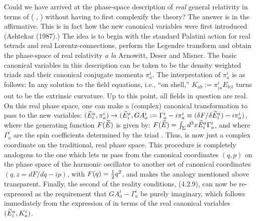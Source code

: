 Could we have arrived at the phase-space description of {\it real} general
relativity in terms of (\A\- , \E\-) without having to first complexify the
theory? The answer is in the affirmative. This is in fact how the new
canonical variables were first introduced (Ashtekar (1987).) The idea is
to begin with the standard Palatini action for real tetrads and real
Lorentz-connections, perform the Legendre transform and obtain the phase-space
of real relativity {\it a la } Arnowitt, Deser and Misner. The basic canonical
variables in this description can be taken to be the density weighted triads
\E\- and their canonical conjugate momenta $\pi_a^i$. The interpretation of
$\pi_a^i$ is as follows: In any solution to the field equations, i.e.,
``on shell,'' $K_{ab}:= \pi_{(a}^i E_{b)i}$ turns out to be the extrinsic
curvature. Up to this point, all fields in question are real. On this real
phase space, one can make a (complex) canonical transformation to pass to the
new variables: $(\widetilde{E}^a_i, \pi_a^i)\rightarrow (\widetilde{E}^a_i , GA_a^i := \Gamma_a^i -
i \pi_a^i \equiv (\delta F/\delta\widetilde{E}^a_i) - i \pi_a^i)$, where the
generating function $F(\widetilde{E})$ is given by: $F(\widetilde{E}) = \int\nolimits_{\Sigma} d^3x
\widetilde{E}^a_i \Gamma_a^i$, and where $\Gamma_a^i$ are the spin coefficients
determined by the triad \E\-. Thus, \A\- is now just a complex coordinate on
the traditional, real phase space. This procedure is completely analogous to
the one which lets us pass from the canonical coordinates $(q,p)$ on the phase
space of the harmonic oscillator to another set of canonical coordinates
$(q, z = dF/dq - ip)$, with $F(q) = \textstyle{1\over2}q^2$, and makes the
analogy mentioned above transparent. Finally, the second of the reality
conditions, (4.2.9), can now be re-expressed as the requirement that $GA_a^i
- \Gamma_a^i$ be purely imaginary, which follows immediately from the
expression of \A\- in terms of the real canonical variables $(\widetilde{E}^a_i ,
K_a^i)$.

